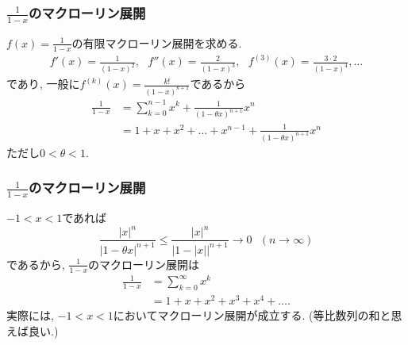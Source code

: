 


\begin{frame}
\frametitle{$\frac{1}{1-x}$のマクローリン展開}

$f(x)=\frac{1}{1-x}$の有限マクローリン展開を求める. 
\begin{align*}
f'(x)=\frac{1}{(1-x)^2}, \ \ \ f''(x)=\frac{2}{(1-x)^3}, \ \ \  f^{(3)}(x)=\frac{3\cdot 2}{(1-x)^4}, \dots 
\end{align*}
であり, 一般に$f^{(k)}(x)=\frac{k!}{(1-x)^{k+1}}$であるから
\begin{align*}
\frac{1}{1-x} & = \sum_{k=0}^{n-1}x^k+\frac{1}{(1-\theta x)^{n+1}}x^n \\
& = 1+x+x^2+\dots+x^{n-1}+\frac{1}{(1-\theta x)^{n+1}}x^n
\end{align*}
ただし$0<\theta < 1$. 

\end{frame}




\begin{frame}
\frametitle{$\frac{1}{1-x}$のマクローリン展開}

$-1 < x < 1$であれば
$$
\frac{|x|^n}{|1-\theta x|^{n+1}} \le \frac{|x|^n}{|1-|x||^{n+1}} \to 0 \ \ \ (n\to \infty)
$$
であるから, $\frac{1}{1-x}$のマクローリン展開は
\begin{align*}
\frac{1}{1-x} & = \sum_{k=0}^{\infty} x^k \\
&=1+x+x^2+x^3+x^4+\dots. 
\end{align*}
実際には, $-1<x<1$においてマクローリン展開が成立する. 
(等比数列の和と思えば良い.)

\end{frame}







